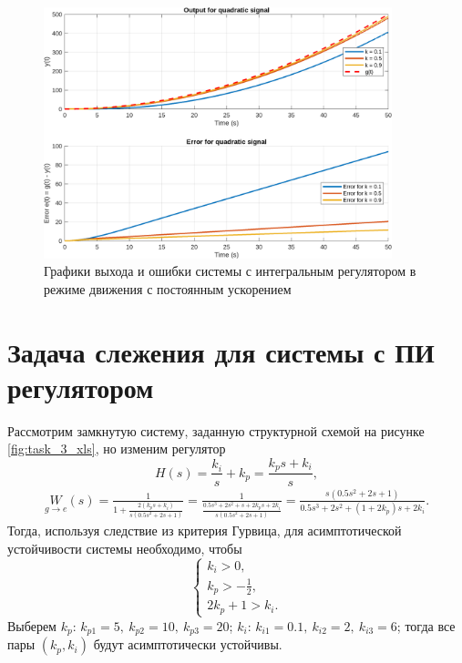 \begin{figure}[H]
    \centering
    \includegraphics[width=0.9\textwidth]{figs/task_4_out_quadratic.png}
    \caption{Графики выхода и ошибки системы с интегральным регулятором в режиме движения с постоянным ускорением}
    \label{fig:task_4_out_quadratic}
\end{figure}



\section{Задача слежения для системы с ПИ регулятором}

Рассмотрим замкнутую систему, заданную структурной схемой на рисунке \ref{fig:task_3_xls},
но изменим регулятор
\begin{equation*}
    H(s)=\frac{{k_i}}{s}+k_p=\frac{k_ps+k_i}{s},
\end{equation*}
\begin{multline*}
    \underset{g\rightarrow e}{W}(s)
    =\frac{1}{1+\frac{2(k_ps+k_i)}{s(0.5s^2+2s+1)}}
    =\frac{1}{\frac{0.5s^3+2s^2+s+2k_ps+2k_i}{s(0.5s^2+2s+1)}}
    =\frac{s(0.5s^2+2s+1)}{0.5s^3+2s^2+(1+2k_p)s+2k_i}.
\end{multline*}
Тогда, используя следствие из критерия Гурвица, для асимптотической устойчивости системы
необходимо, чтобы 
\begin{equation*}
    \begin{cases}
        k_i>0,\\
        k_p>-\frac{1}{2},\\
        2k_p+1>k_i.
    \end{cases}
\end{equation*} 
Выберем $k_p$: $k_{p1}=5,\ k_{p2}=10,\ k_{p3}=20$;
$k_i$: $k_{i1}=0.1,\ k_{i2}=2,\ k_{i3}=6$; тогда все пары $(k_p,k_i)$ будут
асимптотически устойчивы.

